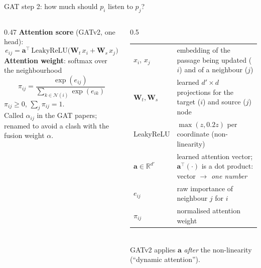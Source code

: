 \documentclass[aspectratio=169,11pt]{beamer}
\makeatletter
\newcommand{\gloss}[1]{\begingroup\footnotesize\renewcommand{\arraystretch}{1.18}\begin{tabular}{@{}>{\color{ctx}}l@{\hspace{0.6em}}>{\raggedright\arraybackslash}p{#1}@{}}}
\newcommand{\glossend}{\end{tabular}\endgroup}
\makeatother
\begin{document}
\begin{frame}{GAT step 2: how much should $p_i$ listen to $p_j$?}
\begin{columns}[T]
\begin{column}{0.47\textwidth}
\textbf{Attention score} (GATv2, one head):
\[e_{ij}=\mathbf a^{\!\top}\,\mathrm{LeakyReLU}\big(\mathbf W_t\,x_i+\mathbf W_s\,x_j\big)\]
\textbf{Attention weight}: softmax over the neighbourhood
\[\pi_{ij}=\frac{\exp(e_{ij})}{\sum_{k\in\mathcal N(i)}\exp(e_{ik})}\]
{\small $\pi_{ij}\ge0$, $\sum_{j}\pi_{ij}=1$.\\[0.1cm]
{\color{muted}Called $\alpha_{ij}$ in the GAT papers; renamed to avoid a clash with the fusion weight $\alpha$.}}
\end{column}
\begin{column}{0.5\textwidth}
\gloss{4.9cm}
$x_i$, $x_j$ & embedding of the passage being updated ($i$) and of a neighbour ($j$)\\
$\mathbf W_t,\mathbf W_s$ & learned $d'\times d$ projections for the target ($i$) and source ($j$) node\\
LeakyReLU & $\max(z,0.2z)$ per coordinate (non-linearity)\\
$\mathbf a\in\mathbb R^{d'}$ & learned attention vector; $\mathbf a^{\!\top}(\cdot)$ is a dot product: vector $\to$ \emph{one number}\\
$e_{ij}$ & raw importance of neighbour $j$ for $i$\\
$\pi_{ij}$ & normalised attention weight\\
\glossend\\[0.15cm]
{\scriptsize\color{muted}GATv2 applies $\mathbf a$ \emph{after} the non-linearity (``dynamic attention'').}
\end{column}
\end{columns}
\end{frame}
\end{document}
